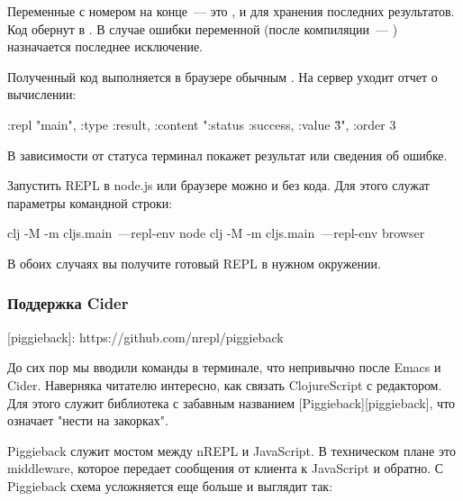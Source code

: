 Переменные  с номером на конце~--- это ,  и  для хранения последних результатов. Код обернут в . В случае ошибки переменной  (после компиляции~--- ) назначается последнее исключение.

Полученный код выполняется в браузере обычным . На сервер уходит отчет о вычислении:

\begin{english}
  \begin{clojure}
{:repl "main",
 :type :result,
 :content "{:status :success, :value \"3\"}",
 :order 3}
  \end{clojure}
\end{english}

В зависимости от статуса терминал покажет результат или сведения об ошибке.

Запустить REPL в node.js или браузере можно и без кода. Для этого служат параметры командной строки:

\begin{english}
  \begin{bash}
clj -M -m cljs.main~---repl-env node
clj -M -m cljs.main~---repl-env browser
  \end{bash}
\end{english}

В обоих случаях вы получите готовый REPL в нужном окружении.

\subsubsection{Поддержка Cider}

[piggieback]: https://github.com/nrepl/piggieback

До сих пор мы вводили команды в терминале, что непривычно после Emacs и Cider. Наверняка читателю интересно, как связать  ClojureScript с редактором. Для этого служит библиотека с забавным названием [Piggieback][piggieback], что означает "нести на закорках".

Piggieback служит мостом между nREPL и JavaScript. В техническом плане это middleware, которое передает сообщения от клиента к JavaScript и обратно. С Piggieback схема усложняется еще больше и выглядит так:

